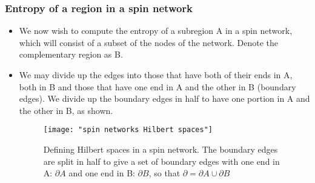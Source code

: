 \documentclass[11pt]{beamer}
\begin{document}
\begin{frame}
	
	\frametitle{Entropy of a region in a spin network}
	
	\begin{itemize}
		
		
		\item We now wish to compute the entropy of a subregion A in a spin network, which will consist of a subset of the nodes of the network. Denote the complementary region as B.
		
		\item We may divide up the edges into those that have both of their ends in A, both in B and those that have one end in A and the other in B (boundary edges). We divide up the boundary edges in half to have one portion in A and the other in B, as shown.
		
		\begin{figure}
			\centering
			\texttt{[image: "spin networks Hilbert spaces"]}
			\caption{Defining Hilbert spaces in a spin network. The boundary edges are split in half to give a set of boundary edges with one end in A: $\partial A$ and one end in B: $\partial B$, so that $\partial = \partial A \cup \partial B$}
			\label{fig:spin-networks-hilbert-spaces}
		\end{figure}
		
	\end{itemize}
	
\end{frame}
\end{document}
